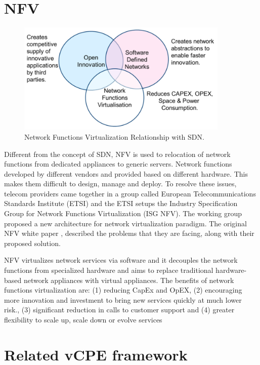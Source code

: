 \section{NFV} \label{sec:nfv}

\begin{figure}[!ht]
\centering
\includegraphics[width=0.9\textwidth]{./fig/nfv_and_sdn.png}
\caption{Network Functions Virtualization Relationship with SDN. \cite{nfv-wp}}
\label{fig:nfv_and_sdn}
\end{figure}


Different from the concept of SDN, NFV is used to relocation of network functions from dedicated appliances to generic servers.
Network functions developed by different vendors and provided based on different hardware. This makes them difficult to design, manage and deploy.
To resolve these issues, telecom providers came together in a group called European Telecommunications Standards Institute (ETSI) and the ETSI setups the Industry Specification Group for Network Functions Virtualization (ISG NFV). The working group proposed a new architecture for network virtualization paradigm. The original NFV white paper \cite{nfv-wp}, described the problems that they are facing, along with their proposed solution.

NFV virtualizes network services via software and it decouples the network functions from specialized hardware and aims to replace traditional hardware-based network appliances with virtual appliances.
The benefits of network functions virtualization are: (1) reducing CapEx and OpEX, (2) encouraging more innovation and investment to bring new services quickly at much lower risk., (3) significant reduction in calls to customer support and (4) greater flexibility to scale up, scale down or evolve services


\section{Related vCPE framework} \label{sec:related_vcpe}
